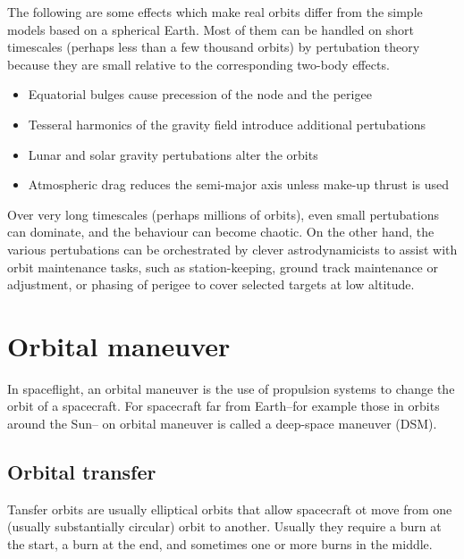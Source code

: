 \documentclass[12pt]{article}
\begin{document}
The following are some effects which make real orbits differ from the simple models based on a spherical Earth. Most of them can be handled on short timescales (perhaps less than a few thousand orbits) by pertubation theory because they are small relative to the corresponding two-body effects.

\begin{itemize}
  \item Equatorial bulges cause precession of the node and the perigee
  \item Tesseral harmonics of the gravity field introduce additional pertubations
  \item Lunar and solar gravity pertubations alter the orbits
  \item Atmospheric drag reduces the semi-major axis unless make-up thrust is used
\end{itemize}

Over very long timescales (perhaps millions of orbits), even small pertubations can dominate, and the behaviour can become chaotic. On the other hand, the various pertubations can be orchestrated by clever astrodynamicists to assist with orbit maintenance tasks, such as station-keeping, ground track maintenance or adjustment, or phasing of perigee to cover selected targets at low altitude.

\section{Orbital maneuver}

In spaceflight, an orbital maneuver is the use of propulsion systems to change the orbit of a spacecraft. For spacecraft far from Earth--for example those in orbits around the Sun-- on orbital maneuver is called a deep-space maneuver (DSM).

\subsection{Orbital transfer}

Tansfer orbits are usually elliptical orbits that allow spacecraft ot move from one (usually substantially circular) orbit to another. Usually they require a burn at the start, a burn at the end, and sometimes one or more burns in the middle.
\end{document}
